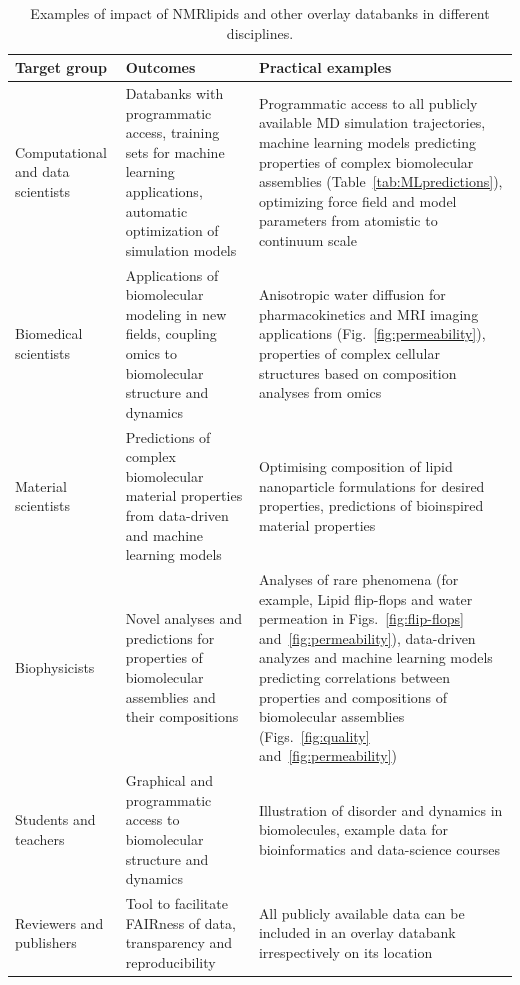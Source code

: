 \documentclass[fleqn,10pt]{wlscirep}
\begin{document}
\begin{table}[t]
    \centering
    \begin{tabular}{p{3.0cm}  p{4.0cm}  p{7.0cm}}
     Target group  &  Outcomes     & Practical examples \\
    \hline
    Computational and data scientists & Databanks with programmatic access, training sets for machine learning applications, automatic optimization of simulation models & Programmatic access to all publicly available MD simulation trajectories, machine learning models predicting properties of complex biomolecular assemblies (Table~\ref{tab:MLpredictions}), optimizing force field and model parameters from atomistic to continuum scale \\

    Biomedical scientists & Applications of biomolecular modeling in new fields, coupling omics to biomolecular structure and dynamics & Anisotropic water diffusion for pharmacokinetics and MRI imaging applications (Fig.~\ref{fig:permeability}), properties of complex cellular structures based on composition analyses from omics \\
    
    Material scientists & Predictions of complex biomolecular material properties from data-driven and machine learning models & Optimising composition of lipid nanoparticle formulations for desired properties, predictions of bioinspired material properties \\
    
    Biophysicists &  Novel analyses and predictions for properties of biomolecular assemblies and their compositions  & Analyses of rare phenomena (for example, Lipid flip-flops and water permeation in Figs.~\ref{fig:flip-flops} and~\ref{fig:permeability}), data-driven analyzes and machine learning models  predicting correlations between properties and compositions of biomolecular assemblies (Figs.~\ref{fig:quality} and~\ref{fig:permeability}) \\

    Students and teachers & Graphical and programmatic access to biomolecular structure and dynamics & Illustration of disorder and dynamics in biomolecules, example data for bioinformatics and data-science courses \\  

    Reviewers and publishers & Tool to facilitate FAIRness of data, transparency and reproducibility & All publicly available data can be included in an overlay databank irrespectively on its location \\ 
    
    \end{tabular}
    \caption{Examples of impact of NMRlipids and other overlay databanks in different disciplines.}
    \label{tab:applications}
\end{table}
\end{document}
